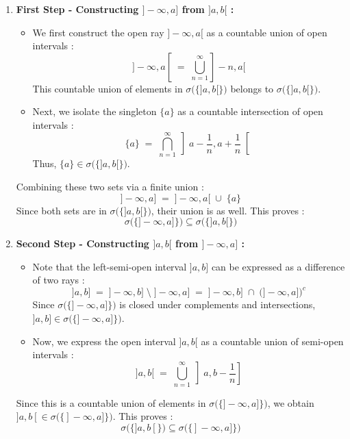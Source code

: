 \begin{enumerate}[label=\textbf{§}]
    \item \textbf{First Step - Constructing $]-\infty, a]$ from $]a, b[$ :}
    \begin{itemize}
        \item We first construct the open ray $]-\infty, a[$ as a countable union of open intervals :
        \[
            ]-\infty, a[ \;=\; \bigcup_{n=1}^\infty ]-n, a[
        \]
        This countable union of elements in $\sigma\big(\{]a, b[\}\big)$ belongs to $\sigma\big(\{]a, b[\}\big)$.
        
        \item Next, we isolate the singleton $\{a\}$ as a countable intersection of open intervals :
        \[
            \{a\} \;=\; \bigcap_{n=1}^\infty \left] a - \frac{1}{n}, a + \frac{1}{n} \right[
        \]
        Thus, $\{a\} \in \sigma\big(\{]a, b[\}\big)$.
    \end{itemize}
    Combining these two sets via a finite union :
    \[
        ]-\infty, a] \;=\; ]-\infty, a[ \;\cup\; \{a\}
    \]
    Since both sets are in $\sigma\big(\{]a, b[\}\big)$, their union is as well. This proves :
    \[
        \sigma\Big( \big\{ ]-\infty, a] \big\} \Big) \subseteq \sigma\Big( \big\{ ]a, b[ \big\} \Big)
    \]

    \item \textbf{Second Step - Constructing $]a, b[$ from $]-\infty, a]$ :}
    \begin{itemize}
        \item Note that the left-semi-open interval $]a, b]$ can be expressed as a difference of two rays :
        \[
            ]a, b] \;=\; ]-\infty, b] \;\setminus\; ]-\infty, a] \;=\; ]-\infty, b] \;\cap\; \big( ]-\infty, a] \big)^c
        \]
        Since $\sigma\big(\{]-\infty, a]\}\big)$ is closed under complements and intersections, $]a, b] \in \sigma\big(\{]-\infty, a]\}\big)$.
        
        \item Now, we express the open interval $]a, b[$ as a countable union of semi-open intervals :
        \[
            ]a, b[ \;=\; \bigcup_{n=1}^\infty \left] a, b - \frac{1}{n} \right]
        \]
    \end{itemize}
    Since this is a countable union of elements in $\sigma\big(\{]-\infty, a]\}\big)$, we obtain $]a, b[ \in \sigma\big(\{]-\infty, a]\}\big)$. This proves :
    \[
        \sigma\Big( \big\{ ]a, b[ \big\} \Big) \subseteq \sigma\Big( \big\{ ]-\infty, a] \big\} \Big)
    \]
\end{enumerate}

